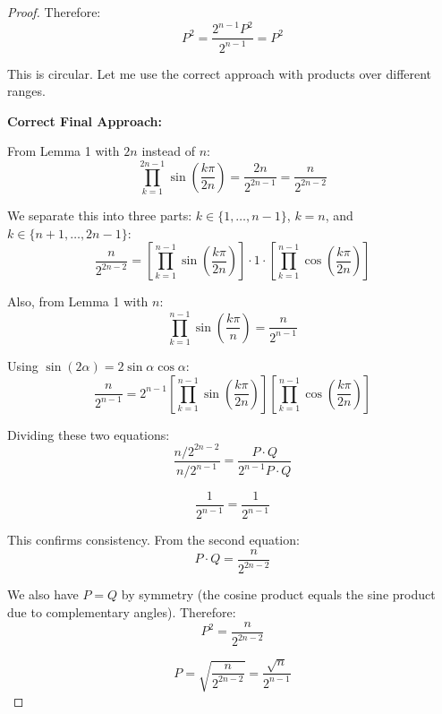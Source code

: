 \documentclass{article}
\begin{document}
\begin{proof}
Therefore:
\begin{equation}
P^2 = \frac{2^{n-1}P^2}{2^{n-1}} = P^2
\end{equation}

This is circular. Let me use the correct approach with products over different ranges.

\textbf{Correct Final Approach:}

From Lemma 1 with $2n$ instead of $n$:
\begin{equation}
\prod_{k=1}^{2n-1}\sin\left(\frac{k\pi}{2n}\right) = \frac{2n}{2^{2n-1}} = \frac{n}{2^{2n-2}}
\end{equation}

We separate this into three parts: $k \in \{1, \ldots, n-1\}$, $k=n$, and $k \in \{n+1, \ldots, 2n-1\}$:
\begin{equation}
\frac{n}{2^{2n-2}} = \left[\prod_{k=1}^{n-1}\sin\left(\frac{k\pi}{2n}\right)\right] \cdot 1 \cdot \left[\prod_{k=1}^{n-1}\cos\left(\frac{k\pi}{2n}\right)\right]
\end{equation}

Also, from Lemma 1 with $n$:
\begin{equation}
\prod_{k=1}^{n-1}\sin\left(\frac{k\pi}{n}\right) = \frac{n}{2^{n-1}}
\end{equation}

Using $\sin(2\alpha) = 2\sin\alpha\cos\alpha$:
\begin{equation}
\frac{n}{2^{n-1}} = 2^{n-1}\left[\prod_{k=1}^{n-1}\sin\left(\frac{k\pi}{2n}\right)\right]\left[\prod_{k=1}^{n-1}\cos\left(\frac{k\pi}{2n}\right)\right]
\end{equation}

Dividing these two equations:
\begin{equation}
\frac{n/2^{2n-2}}{n/2^{n-1}} = \frac{P \cdot Q}{2^{n-1} P \cdot Q}
\end{equation}

\begin{equation}
\frac{1}{2^{n-1}} = \frac{1}{2^{n-1}}
\end{equation}

This confirms consistency. From the second equation:
\begin{equation}
P \cdot Q = \frac{n}{2^{2n-2}}
\end{equation}

We also have $P = Q$ by symmetry (the cosine product equals the sine product due to complementary angles). Therefore:
\begin{equation}
P^2 = \frac{n}{2^{2n-2}}
\end{equation}

\begin{equation}
P = \sqrt{\frac{n}{2^{2n-2}}} = \frac{\sqrt{n}}{2^{n-1}}
\end{equation}
\end{proof}
\end{document}
